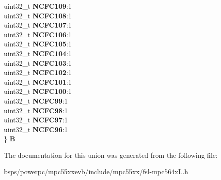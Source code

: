 \begin{DoxyCompactItemize}
\begin{tabbing}
\>uint32\_t {\bfseries NCFC109}:1\\
\>uint32\_t {\bfseries NCFC108}:1\\
\>uint32\_t {\bfseries NCFC107}:1\\
\>uint32\_t {\bfseries NCFC106}:1\\
\>uint32\_t {\bfseries NCFC105}:1\\
\>uint32\_t {\bfseries NCFC104}:1\\
\>uint32\_t {\bfseries NCFC103}:1\\
\>uint32\_t {\bfseries NCFC102}:1\\
\>uint32\_t {\bfseries NCFC101}:1\\
\>uint32\_t {\bfseries NCFC100}:1\\
\>uint32\_t {\bfseries NCFC99}:1\\
\>uint32\_t {\bfseries NCFC98}:1\\
\>uint32\_t {\bfseries NCFC97}:1\\
\>uint32\_t {\bfseries NCFC96}:1\\
\} {\bfseries B}\\

\end{tabbing}\end{DoxyCompactItemize}


The documentation for this union was generated from the following file\+:\begin{DoxyCompactItemize}
\item 
bsps/powerpc/mpc55xxevb/include/mpc55xx/fsl-\/mpc564x\+L.\+h\end{DoxyCompactItemize}
